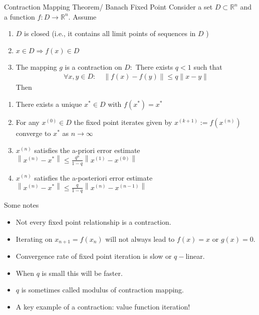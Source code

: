 \begin{frame}{Contraction Mapping Theorem/ Banach Fixed Point}
\small
Consider a set $D \subset \mathbb{R}^{n}$ and a function $f: D \rightarrow \mathbb{R}^{n} .$ Assume
\begin{enumerate}
\item $D$ is closed (i.e., it contains all limit points of sequences in $D$ )
\item $x \in D \Longrightarrow f(x) \in D$
\item The mapping $g$ is a contraction on $D:$ There exists $q<1$ such that
\begin{align*}
\forall x, y \in D: \quad\|f(x)-f(y)\| \leq q\|x-y\|
\end{align*}
\noindent Then \vspace{-.3cm}
\end{enumerate}
\begin{enumerate}
\item There exists a unique  $x^{*} \in D$ with $f\left(x^{*}\right)=x^{*}$
\item For any $x^{(0)} \in D$ the fixed point iterates given by $x^{(k+1)}:=f\left(x^{(n)}\right)$ converge to $x^{*}$ as $n \rightarrow \infty$
\item $x^{(n)}$ satisfies the \alert{a-priori error} estimate $\left\|x^{(n)}-x^{*}\right\| \leq \frac{q^{n}}{1-q}\left\|x^{(1)}-x^{(0)}\right\|$
\item $x^{(n)}$ satisfies the \alert{a-posteriori error} estimate $\left\|x^{(n)}-x^{*}\right\| \leq \frac{q}{1-q}\left\|x^{(n)}-x^{(n-1)}\right\|$
\end{enumerate}
\end{frame}



\begin{frame}{Some notes}
\begin{itemize}
\item Not every fixed point relationship is a contraction.
\item Iterating on $x_{n+1} = f(x_n)$ will not always lead to $f(x) = x$ or $g(x) =0$.
\item Convergence rate of fixed point iteration is \alert{slow} or $q-$linear.
\item When $q$ is small this will be faster.
\item $q$ is sometimes called \alert{modulus} of contraction mapping.
\item A key example of a contraction: \alert{value function iteration}!
\end{itemize}
\end{frame}

